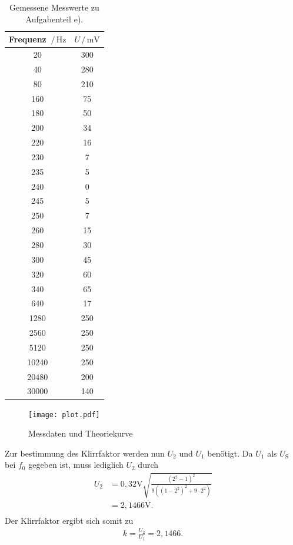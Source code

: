 \begin{table}[H]
  \centering
  \caption{Gemessene Messwerte zu Aufgabenteil e).}
  \label{tab:wertee}
  \begin{tabular}{c c}
    \toprule
    Frequenz $\,/\,\si{\hertz}$ &  $U\,/\, \si{\milli\volt}$ \\
    \midrule
    20 & 300 \\
    40 & 280 \\
    80 & 210 \\
    160 & 75 \\
    180 & 50 \\
    200 & 34 \\
    220 & 16 \\
    230 & 7 \\
    235 & 5 \\
    240 & 0 \\
    245 & 5 \\
    250 & 7 \\
    260 & 15 \\
    280 & 30 \\
    300 & 45 \\
    320 & 60 \\
    340 & 65 \\
    640 & 17 \\
    1280 & 250 \\
    2560 & 250 \\
    5120 &  250 \\
    10240 & 250 \\
    20480 & 200 \\
    30000 & 140 \\
    \bottomrule
  \end{tabular}
\end{table}

\begin{figure}[H]
  \centering
  \texttt{[image: plot.pdf]}
  \caption{Messdaten und Theoriekurve}
  \label{fig:plot}
\end{figure}

Zur bestimmung des Klirrfaktor werden nun $U_2$ und $U_1$ benötigt. Da $U_1$ als $U_{\text{S}}$ bei $f_0$ gegeben ist, muss lediglich $U_2$ durch
\begin{align*}
  U_2 &= 0,32\si{\volt}{\sqrt{\frac{(2^2 - 1)^2}{9((1-2^2)^2 + 9 \cdot 2^2)}}} \\
  &= 2,1466 \si{\volt}. \\
\end{align*}
Der Klirrfaktor ergibt sich somit zu
\begin{align*}
  k = \frac{U_2}{U_1} = 2,1466. \\
\end{align*}

